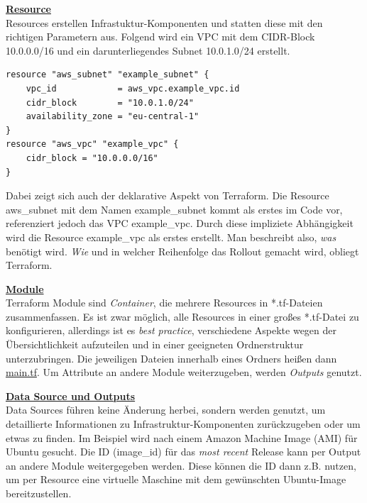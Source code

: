 \textbf{\underline{Resource}}\\
Resources erstellen Infrastuktur-Komponenten und statten diese mit den richtigen Parametern aus. Folgend wird ein VPC mit dem CIDR-Block 10.0.0.0/16 und ein darunterliegendes Subnet 10.0.1.0/24 erstellt.

\begin{verbatim}
resource "aws_subnet" "example_subnet" {
    vpc_id            = aws_vpc.example_vpc.id
    cidr_block        = "10.0.1.0/24"
    availability_zone = "eu-central-1"
}
resource "aws_vpc" "example_vpc" {
    cidr_block = "10.0.0.0/16"
}
\end{verbatim}

Dabei zeigt sich auch der deklarative Aspekt von Terraform. Die Resource \glqq aws\_subnet\grqq{} mit dem Namen \glqq example\_subnet\grqq{} kommt als erstes im Code vor, referenziert jedoch das VPC \glqq example\_vpc\grqq{}. Durch diese impliziete Abhängigkeit wird die Resource \glqq example\_vpc\grqq{} als erstes erstellt. Man beschreibt also, \textit{was} benötigt wird. \textit{Wie} und in welcher Reihenfolge das Rollout gemacht wird, obliegt Terraform.

\textbf{\underline{Module}}\\
Terraform Module sind \textit{Container}, die mehrere Resources in *.tf-Dateien zusammenfassen. Es ist zwar möglich, alle Resources in einer großes *.tf-Datei zu konfigurieren, allerdings ist es \textit{best practice}, verschiedene Aspekte wegen der Übersichtlichkeit aufzuteilen und in einer geeigneten Ordnerstruktur unterzubringen. Die jeweiligen Dateien innerhalb eines Ordners heißen dann \underline{main.tf}. Um Attribute an andere Module weiterzugeben, werden \textit{Outputs} genutzt. 

\textbf{\underline{Data Source und Outputs}}\\
Data Sources führen keine Änderung herbei, sondern werden genutzt, um detaillierte Informationen zu Infrastruktur-Komponenten zurückzugeben oder um etwas zu finden. Im Beispiel wird nach einem Amazon Machine Image (AMI) für Ubuntu gesucht. Die ID (image\_id) für das \textit{most recent} Release kann per Output an andere Module weitergegeben werden. Diese können die ID dann z.B. nutzen, um per Resource eine virtuelle Maschine mit dem gewünschten Ubuntu-Image bereitzustellen.

